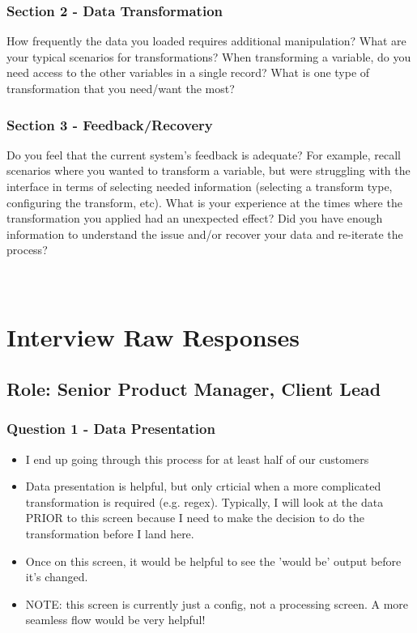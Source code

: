 \documentclass[12pt,letterpaper]{article}
\begin{document}
\subsubsection*{Section 2 - Data Transformation}
How frequently the data you loaded requires additional manipulation? What are your typical scenarios for transformations? When transforming a variable, do you need access to the other variables in a single record? What is one type of transformation that you need/want the most?  

\subsubsection*{Section 3 - Feedback/Recovery}
Do you feel that the current system's feedback is adequate? For example, recall scenarios where you wanted to transform a variable, but were struggling with the interface in terms of selecting needed information (selecting a transform type, configuring the transform, etc). What is your experience at the times where the transformation you applied had an unexpected effect? Did you have enough information to understand the issue and/or recover your data and re-iterate the process?

\section{\\Interview Raw Responses}

\subsection*{Role: Senior Product Manager, Client Lead}
\subsubsection*{Question 1 - Data Presentation} 

\begin{itemize}
    \item I end up going through this process for at least half of our customers
    \item Data presentation is helpful, but only crticial when a more complicated transformation is required (e.g. regex). Typically, I will look at the data PRIOR to this screen because I need to make the decision to do the transformation before I land here. 
    \item Once on this screen, it would be helpful to see the 'would be' output before it's changed.
    \item NOTE: this screen is currently just a config, not a processing screen. A more seamless flow would be very helpful!
\end{itemize}
\end{document}
